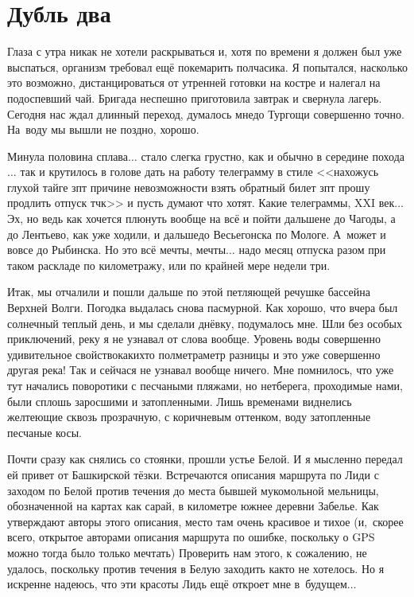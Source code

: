 \chapter{Дубль два} 
\vepsianrose

Глаза с утра никак не хотели раскрываться и, хотя по времени я должен был уже выспаться, организм требовал ещё покемарить полчасика. Я попытался, насколько это возможно, дистанцироваться от утренней готовки на костре и налегал на подоспевший чай. Бригада неспешно приготовила завтрак и свернула лагерь. Сегодня нас ждал длинный переход, думалось мне\mdash до Тургощи совершенно точно. На~воду мы вышли не поздно, хорошо.  

Минула половина сплава$\ldots$ стало слегка грустно, как и обычно в середине похода$\ldots$ так и крутилось в голове дать на работу телеграмму в стиле <<нахожусь глухой тайге зпт причине невозможности взять обратный билет зпт прошу продлить отпуск тчк>> и пусть думают что хотят. Какие телеграммы, XXI век$\ldots$ Эх, но ведь как хочется плюнуть вообще на всё и пойти дальше\mdash не до Чагоды, а до Лентьево, как уже ходили, и дальше\mdash до Весьегонска по Мологе. А~может и вовсе до Рыбинска. Но это всё мечты, мечты$\ldots$ надо месяц отпуска разом при таком раскладе по километражу, или по крайней мере недели три.

Итак, мы отчалили и пошли дальше по этой петляющей речушке бассейна Верхней Волги. Погодка выдалась снова пасмурной. Как хорошо, что вчера был солнечный теплый день, и мы сделали днёвку, подумалось мне. Шли без особых приключений, реку я не узнавал от слова вообще. Уровень воды совершенно удивительное свойство\mdash каких\sdash то полметра\sdash метр разницы и это уже совершенно другая река! Так и сейчас\mdash я не узнавал вообще ничего. Мне помнилось, что уже тут начались поворотики с песчаными пляжами, но нет\mdash берега, проходимые нами, были сплошь заросшими и затопленными. Лишь временами виднелись желтеющие сквозь прозрачную, с коричневым оттенком, воду затопленные песчаные косы.

Почти сразу как снялись со стоянки, прошли устье Белой. И я мысленно передал ей привет от Башкирской тёзки. Встречаются описания маршрута по Лиди с заходом по Белой против течения до места бывшей мукомольной мельницы, обозначенной на картах как сарай, в километре южнее деревни Забелье. Как утверждают авторы этого описания, место там очень красивое и тихое (и,~скорее всего, открытое авторами описания маршрута по ошибке, поскольку о GPS можно тогда было только мечтать) Проверить нам этого, к сожалению, не удалось, поскольку против течения в Белую заходить как\sdash то не хотелось. Но я искренне надеюсь, что эти красоты Лидь ещё откроет мне в~будущем$\ldots$

